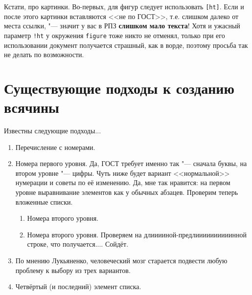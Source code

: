 



Кстати, про картинки. Во-первых, для фигур следует использовать \texttt{[ht]}. Если и после этого картинки вставляются <<не по ГОСТ>>, т.е. слишком далеко от места ссылки, "--- значит у вас в РПЗ \textbf{слишком мало текста}! Хотя и ужасный параметр \texttt{!ht} у окружения \texttt{figure} тоже никто не отменял, только при его использовании документ получается страшный, как в ворде, поэтому просьба так не делать по возможности.

\section{Существующие подходы к созданию всячины}

Известны следующие подходы...

\begin{enumerate}
\item Перечисление с номерами.
\item Номера первого уровня. Да, ГОСТ требует именно так "--- сначала буквы, на втором уровне "--- цифры.
Чуть ниже будет вариант <<нормальной>> нумерации и советы по её изменению.
Да, мне так нравится: на первом уровне выравнивание элементов как у обычных абзацев. Проверим теперь вложенные списки.
\begin{enumerate}
\item Номера второго уровня.
\item Номера второго уровня. Проверяем на длииииной-предлиииииииииинной строке, что получается.... Сойдёт.
\end{enumerate}
\item По мнению Лукьяненко, человеческий мозг старается подвести любую проблему к выбору
  из трех вариантов.
\item Четвёртый (и последний) элемент списка.
\end{enumerate}

